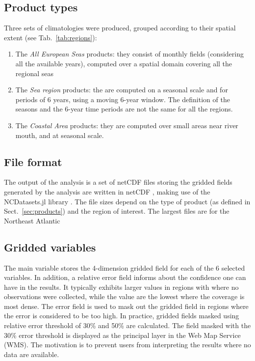 \documentclass[essd, manuscript]{copernicus}
\begin{document}
\subsection{Product types\label{sec:products}}

Three sets of climatologies were produced, grouped according to their spatial extent (see Tab.~\ref{tab:regions}): 
\begin{enumerate}
\item The \textit{All European Seas} products: they consist of monthly fields (considering all the available years), computed over a spatial domain covering all the regional seas
\item The \textit{Sea region} products: the are computed on a seasonal scale and for periods of 6 years, using a moving 6-year window. The definition of the seasons and the 6-year time periods are not the same for all the regions. 
\item The \textit{Coastal Area} products: they are computed over small areas near river mouth, and at seasonal scale.
\end{enumerate}

\subsection{File format}

The output of the analysis is a set of netCDF files storing the gridded fields generated by the analysis are written in netCDF \citep{Rew1990,Brown1993}, making use of the NCDatasets.jl library \citep{Barth2024}. The file sizes depend on the type of product (as defined in Sect.~\ref{sec:products}) and the region of interest. The largest files are for the Northeast Atlantic

\subsection{Gridded variables}

The main variable stores the 4-dimension gridded field for each of the 6 selected variables. In addition, a relative error field informs about the confidence one can have in the results. It typically exhibits larger values in regions with where no observations were collected, while the value are the lowest where the coverage is most dense. The error field is used to mask out the gridded field in regions where the error is considered to be too high. In practice, gridded fields masked using relative error threshold of 30\% and 50\% are calculated. The field masked with the 30\% error threshold is displayed as the principal layer in the Web Map Service (WMS). The motivation is to prevent users from interpreting the results where no data are available. 
\end{document}
